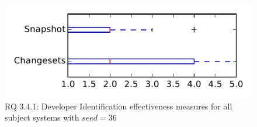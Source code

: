 
\begin{figure}
\centering
\includegraphics[height=0.4\textheight]{figures/dit_seed/rq1_tiny_36}
\caption{RQ 3.4.1: Developer Identification effectiveness measures for all subject systems with $seed=36$}
\label{fig:dit_seed:rq1:tiny}
\end{figure}
